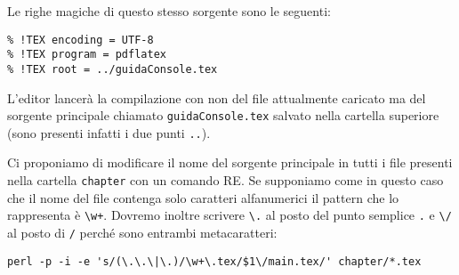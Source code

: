 Le righe magiche di questo stesso sorgente sono le seguenti:
\begin{verbatim}
% !TEX encoding = UTF-8
% !TEX program = pdflatex
% !TEX root = ../guidaConsole.tex
\end{verbatim}
L'editor lancerà la compilazione con  non del file attualmente caricato ma del sorgente principale chiamato \texttt{guidaConsole.tex} salvato nella cartella superiore (sono presenti infatti i due punti \texttt{..}).

Ci proponiamo di modificare il nome del sorgente principale in tutti i file presenti nella cartella \texttt{chapter} con un comando RE. Se supponiamo come in questo caso che il nome del file contenga solo caratteri alfanumerici il pattern che lo rappresenta è \texttt{\textbackslash w+}. Dovremo inoltre scrivere \texttt{\textbackslash .} al posto del punto semplice \texttt{.} e \texttt{\textbackslash /} al posto di \texttt{/} perché sono entrambi metacaratteri: 
\begin{Verbatim}[fontsize=\small]
perl -p -i -e 's/(\.\.\|\.)/\w+\.tex/$1\/main.tex/' chapter/*.tex
\end{Verbatim}

\endinput



\section{Creazione di cartelle ramificate}

\section{Aprire il terminale da una cartella}


\section{Redirezione dei dati}


\section{Operare con i diritti di root}

\section{Scripting}






\endinput

